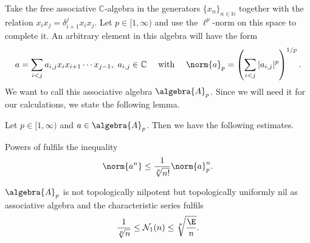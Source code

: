 \documentclass[
11pt,                          %
english                        %
]{article}
\begin{document}
Take the free associative $\mathbb{C}$-algebra in the generators $\{x_n\}_{n \in 
\mathbb{N}}$ together with the relation $x_i x_j = \delta_{i+1}^j x_i x_j$. Let 
$p \in [1, \infty)$ and use the $\ell^p$-norm on this space to complete it. An 
arbitrary element in this algebra will have the form
\begin{equation*}
	a =
	\sum\limits_{i < j}
	a_{i, j} x_i x_{i + 1} \cdots x_{j - 1}
	, \
	a_{i,j} \in \mathbb{C}
	\quad \text{ with } \quad
	\norm{a}_p
	=
	\left(
		\sum\limits_{i < j}
		|a_{i, j}|^p
	\right)^{1/p}.
\end{equation*}
We want to call this associative algebra $\algebra{A}_p$. Since we will need it for 
our calculations, we state the following lemma.
\begin{lemma}
	\label{lemma:Ex1}
	Let $p \in [1, \infty)$ and $a \in \algebra{A}_p$. 
	Then we have the following estimates.
	\begin{lemmalist}
		\item
		Powers of  fulfils the inequality
		\begin{equation}
			\label{eq:lemma:Ex1Powers}
			\norm{a^n}
			\leq
			\frac{1}{\sqrt[p]{n!}}
			\norm{a}_p^n.
		\end{equation}
		
		\item
		$\algebra{A}_p$ is not topologically nilpotent but topologically uniformly 
		nil as associative algebra and the characteristic series fulfils
		\begin{equation}
			\label{eq:lemma:Ex1Sequence}
			\frac{1}{\sqrt[p]{n}}
			\leq 
			\mathcal{N}_1(n) 
			\leq 
			\sqrt[p]{\frac{\E}{n}}.
		\end{equation}	
	\end{lemmalist}
\end{lemma}
\end{document}
